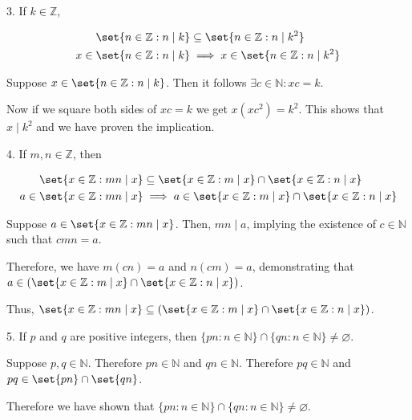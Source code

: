 \documentclass{hippoidC}
\begin{document}
\begin{prooflist}{3. If $k \in \mathbb{Z}$,}
    \item

\begin{align*}
    \set{n \in \mathbb{Z}: n \mid k} &\subseteq \set{n \in \mathbb{Z}: n \mid k^2} \\
    x \in \set{n \in \mathbb{Z}: n \mid k} &\implies x \in \set{n \in \mathbb{Z}: n \mid k^2}
\end{align*}
\item Suppose $x \in \set{n \in \mathbb{Z}: n \mid k}$. Then it follows $\exists
    c\in\mathbb{N}: xc=k$.
\item Now if we square both sides of
$xc=k$ we get $x(xc^2) = k^2$.  This shows that $x\mid k^2$ and we have proven
the implication.
\end{prooflist}

\begin{prooflist}{4. If $m, n \in \mathbb{Z}$, then}
\item
\begin{align*}
    \set{x \in \mathbb{Z}: mn \mid x} &\subseteq \set{x \in \mathbb{Z}: m \mid x} \cap \set{x \in \mathbb{Z}: n \mid x} \\
    a \in \set{x \in \mathbb{Z}: mn \mid x} &\implies a \in \set{x \in \mathbb{Z}: m \mid x} \cap \set{x \in \mathbb{Z}: n \mid x}
\end{align*}
\item Suppose $a \in \set{x \in \mathbb{Z}: mn \mid x}$. Then, $mn \mid a$, implying the existence of $c \in \mathbb{N}$ such that $cmn = a$.
\item Therefore, we have $m(cn) = a$ and $n(cm) = a$, demonstrating that $a \in \left(\set{x \in \mathbb{Z}: m \mid x} \cap \set{x \in \mathbb{Z}: n \mid x}\right)$.
\item Thus, $\set{x \in \mathbb{Z}: mn \mid x} \subseteq \left(\set{x \in \mathbb{Z}: m \mid x} \cap \set{x \in \mathbb{Z}: n \mid x}\right)$.
\end{prooflist}

\begin{prooflist}{5. If $p$ and $q$ are positive integers, then $\{p n: n \in
\mathbb{N}\} \cap\{q n: n \in \mathbb{N}\} \neq \varnothing$.}
\item Suppose $p, q \in \mathbb{N}$. Therefore $pn \in \mathbb{N}$ and
    $qn \in \mathbb{N}$. Therefore $pq \in \mathbb{N}$ and $pq \in \set{pn} \cap
    \set{qn}$.
\item Therefore we have shown that
$\{p n: n \in \mathbb{N}\} \cap\{q n: n \in \mathbb{N}\} \neq \varnothing$.
\end{prooflist}
\end{document}
